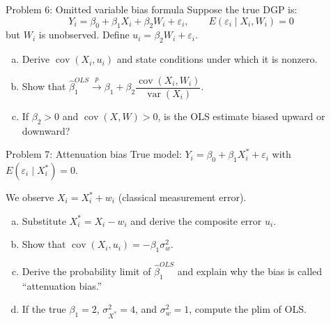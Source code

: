 \documentclass[10pt]{beamer}
\begin{document}
\begin{frame}{Problem 6: Omitted variable bias formula}
\label{q6}
Suppose the true DGP is:
\[
Y_i = \beta_0 + \beta_1 X_i + \beta_2 W_i + \varepsilon_i, \qquad E(\varepsilon_i \mid X_i, W_i) = 0
\]
but $W_i$ is unobserved. Define $u_i = \beta_2 W_i + \varepsilon_i$.

\begin{enumerate}[(a)]
  \item Derive $\operatorname{cov}(X_i, u_i)$ and state conditions under which it is nonzero.
  \item Show that $\widehat{\beta}_1^{OLS} \xrightarrow{p} \beta_1 + \beta_2 \dfrac{\operatorname{cov}(X_i, W_i)}{\operatorname{var}(X_i)}$.
  \item If $\beta_2 > 0$ and $\operatorname{cov}(X,W) > 0$, is the OLS estimate biased upward or downward?
\end{enumerate}

\vfill
\hfill\hyperlink{s6}{}
\end{frame}

\begin{frame}{Problem 7: Attenuation bias}
\label{q7}
True model: $Y_i = \beta_0 + \beta_1 X_i^* + \varepsilon_i$ with $E(\varepsilon_i \mid X_i^*) = 0$.

We observe $X_i = X_i^* + w_i$ (classical measurement error).

\begin{enumerate}[(a)]
  \item Substitute $X_i^* = X_i - w_i$ and derive the composite error $u_i$.
  \item Show that $\operatorname{cov}(X_i, u_i) = -\beta_1 \sigma_w^2$.
  \item Derive the probability limit of $\widehat{\beta}_1^{OLS}$ and explain why the bias is called ``attenuation bias.''
  \item If the true $\beta_1 = 2$, $\sigma_{X^*}^2 = 4$, and $\sigma_w^2 = 1$, compute the plim of OLS.
\end{enumerate}

\vfill
\hfill\hyperlink{s7}{}
\end{frame}
\end{document}
